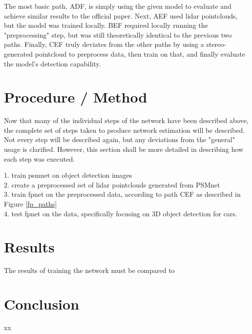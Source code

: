 The most basic path, ADF, is simply using the given model to evaluate and achieve similar results to the official paper. Next, AEF used lidar pointclouds, but the model was trained locally. BEF required locally running the "preprocessing" step, but was still theoretically identical to the previous two paths. Finally, CEF truly deviates from the other paths by using a stereo-generated pointcloud to preprocess data, then train on that, and finally evaluate the model's detection capability. 

\section{Procedure / Method}
Now that many of the individual steps of the network have been described above, the complete set of steps taken to produce network estimation will be described. Not every step will be described again, but any deviations from the "general" usage is clarified. However, this section shall be more detailed in describing how each step was executed.

1. train psmnet on object detection images\\
2. create a preprocessed set of lidar pointclouds generated from PSMnet \\
3. train fpnet on the preprocessed data, according to path CEF as described in Figure \ref{fp_paths} \\
4. test fpnet on the data, specifically focusing on 3D object detection for cars. \\



\section{Results}
The results of training the network must be compared to







\section{Conclusion}
xx